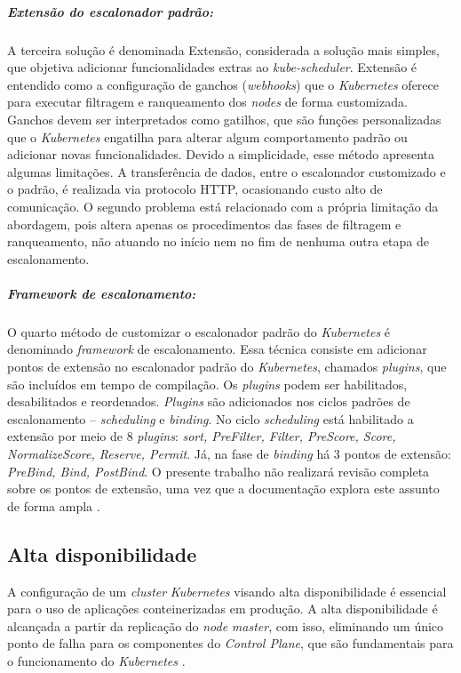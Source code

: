 \subparagraph{Extensão do escalonador padrão:}
A terceira solução é denominada Extensão, considerada a solução mais simples, que objetiva adicionar funcionalidades extras ao \textit{kube-scheduler}. Extensão é entendido como a configuração de ganchos (\textit{webhooks}) que o \textit{Kubernetes} oferece para executar filtragem e ranqueamento dos \textit{nodes} de forma customizada. Ganchos devem ser interpretados como gatilhos, que são funções personalizadas que o \textit{Kubernetes} engatilha para alterar algum comportamento padrão ou adicionar novas funcionalidades. Devido a simplicidade, esse método apresenta algumas limitações. A transferência de dados, entre o escalonador customizado e o padrão, é realizada via protocolo \ac{HTTP}, ocasionando custo alto de comunicação. O segundo problema está relacionado com a própria limitação da abordagem, pois altera apenas os procedimentos das fases de filtragem e ranqueamento, não atuando no início nem no fim de nenhuma outra etapa de escalonamento. 

\subparagraph{\textit{Framework} de escalonamento:}
O quarto método de customizar o escalonador padrão do \textit{Kubernetes} é denominado \textit{framework} de escalonamento. Essa técnica consiste em adicionar pontos de extensão no escalonador padrão do \textit{Kubernetes}, chamados \textit{plugins}, que são incluídos em tempo de compilação. Os \textit{plugins} podem ser habilitados, desabilitados e reordenados. \textit{Plugins} são adicionados nos ciclos padrões de escalonamento -- \textit{scheduling} e \textit{binding}. No ciclo \textit{scheduling} está habilitado a extensão por meio de 8 \textit{plugins}: \textit{sort, PreFilter, Filter, PreScore, Score, NormalizeScore, Reserve, Permit}. Já, na fase de \textit{binding} há 3 pontos de extensão: \textit{PreBind, Bind, PostBind}. O presente trabalho não realizará revisão completa sobre os pontos de extensão, uma vez que a documentação explora este assunto de forma ampla \cite{schedulerframework}.

\subsection{Alta disponibilidade}
A configuração de um \textit{cluster} \textit{Kubernetes} visando alta disponibilidade é essencial para o uso de aplicações conteinerizadas em produção. A alta disponibilidade é alcançada a partir da replicação do \textit{node} \textit{master}, com isso, eliminando um único ponto de falha para os componentes do \textit{Control Plane}, que são fundamentais para o funcionamento do \textit{Kubernetes} \cite{Kubeha}.

